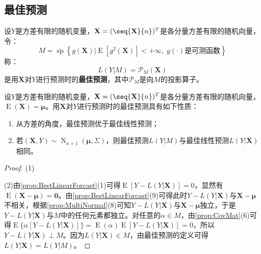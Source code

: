 \subsection{最佳预测}
\begin{definition}
	设$Y$是方差有限的随机变量，$\mathbf{X}=(\seq{\mathbf{X}}{n})^T$是各分量方差有限的随机向量，令：
	\begin{equation*}
		M=\overline{\operatorname{sp}}\left\{g(\mathbf{X})|\operatorname{E}[g^2(\mathbf{X})]<+\infty,\;g(\cdot)\text{是可测函数}\right\}
	\end{equation*}
	称：
	\begin{equation*}
		L(Y|M)=\mathcal{P}_M(\mathbf{X})
	\end{equation*}
	是用$\mathbf{X}$对$Y$进行预测时的\textbf{最佳预测}，其中$\mathcal{P}_M$是向$M$的投影算子。
\end{definition}
\begin{property}
	设$Y$是方差有限的随机变量，$\mathbf{X}=(\seq{\mathbf{X}}{n})^T$是各分量方差有限的随机向量，$\operatorname{E}(\mathbf{X})=\boldsymbol{\mu}$。用$\mathbf{X}$对$Y$进行预测时的最佳预测具有如下性质：
	\begin{enumerate}
		\item 从方差的角度，最佳预测优于最佳线性预测；
		\item 若$(\mathbf{X},Y)\sim\operatorname{N}_{n+1}(\boldsymbol{\mu},\Sigma)$，则最佳预测$L(Y|M)$与最佳线性预测$L(Y|\mathbf{X})$相同。
	\end{enumerate}
\end{property}
\begin{proof}
	(1)\par
	(2)由\cref{prop:BestLinearForcast}(1)可得$\operatorname{E}[Y-L(Y|\mathbf{X})]=0$，显然有$\operatorname{E}(\mathbf{X}-\boldsymbol{\mu})=\mathbf{0}$。由\cref{prop:BestLinearForcast}(9)可得此时$Y-L(Y|\mathbf{X})$与$\mathbf{X}-\boldsymbol{\mu}$不相关，根据\cref{prop:MultiNormal}(8)可知$Y-L(Y|\mathbf{X})$与$\mathbf{X}-\boldsymbol{\mu}$独立，于是$Y-L(Y|\mathbf{X})$与$M$中的任何元素都独立。对任意的$\alpha\in M$，由\cref{prop:CovMat}(6)可得$\operatorname{E}\{\alpha[Y-L(Y|\mathbf{X})]\}=\operatorname{E}(\alpha)\operatorname{E}[Y-L(Y|\mathbf{X})]=0$，所以$Y-L(Y|\mathbf{X})\perp M$。因为$L(Y|\mathbf{X})\in M$，由最佳预测的定义可得$L(Y|\mathbf{X})=L(Y|M)$。
\end{proof}